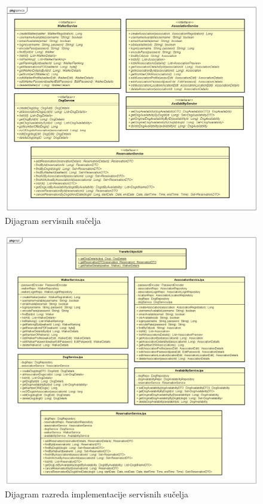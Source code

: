 		    \begin{figure}[H]
    			    \includegraphics[scale=0.27]{dijagrami/classdiagram-service.png}
    			    \centering
    			    \caption{Dijagram servisnih sučelja}
    			    \label{fig:classdiagram-service}
		    \end{figure}
		    
		    \begin{figure}[H]
    			    \includegraphics[scale=0.32]{dijagrami/classdiagram-service-impl.png}
    			    \centering
    			    \caption{Dijagram razreda implementacije servisnih sučelja}
    			    \label{fig:classdiagram-service-impl}
		    \end{figure}
		    
